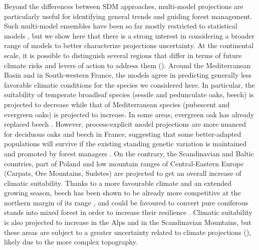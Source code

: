 \documentclass[letterpaper,8pt]{extarticle}  %
\begin{document}
\begin{doublespacing}
\begin{linenumbers}

Beyond the differences between SDM approaches, multi-model projections are particularly useful for identifying general trends and guiding forest management. Such multi-model ensembles have been so far mostly restricted to statistical models \citep{Simmonds2024}, but we show here that there is a strong interest in considering a broader range of models to better characterize projections uncertainty. At the continental scale, it is possible to distinguish several regions that differ in terms of future climate risks and levers of action to address them (). Around the Mediterranean Basin and in South-western France, the models agree in predicting generally less favorable climatic conditions for the species we considered here. In particular, the suitability of temperate broadleaf species (sessile and pedunculate oaks, beech) is projected to decrease while that of Mediterranean species (pubescent and evergreen oaks) is projected to increase. In some areas, evergreen oak has already replaced beech \citep{Penuelas2003}. However, process-explicit model projections are more nuanced for deciduous oaks and beech in France, suggesting that some better-adapted populations will survive if the existing standing genetic variation is maintained and promoted by forest managers \citep{Brang2014}. On the contrary, the Scandinavian and Baltic countries, part of Poland and low mountain ranges of Central-Eastern Europe (Carpats, Ore Mountains, Sudetes) are projected to get an overall increase of climatic suitability. Thanks to a more favourable climate and an extended growing season, beech has been shown to be already more competitive at the northern margin of its range \citep{Bolte2010}, and could be favoured to convert pure coniferous stands into mixed forest in order to increase their resilience \citep{Schauer2023}. Climatic suitability is also projected to increase in the Alps and in the Scandinavian Mountains, but these areas are subject to a greater uncertainty related to climate projections (), likely due to the more complex topography. 


\end{linenumbers}
\end{doublespacing}
\end{document}
